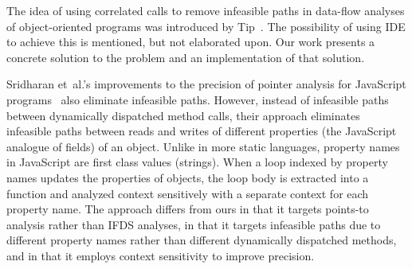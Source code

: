 
The idea of using correlated calls to remove infeasible paths in data-flow analyses of object-oriented programs was introduced by Tip~\cite{DBLP:journals/scp/Tip15}. The possibility of using IDE to achieve this is mentioned, but not elaborated upon. Our work presents a concrete solution to the problem and an implementation of that solution.

Sridharan et~al.'s improvements to the precision of pointer analysis
for JavaScript programs~\cite{DBLP:conf/ecoop/SridharanDCST12} also
eliminate infeasible paths. However, instead of infeasible paths
between dynamically dispatched method calls, their approach eliminates
infeasible paths between reads and writes of different properties
(the JavaScript analogue of fields) of an object. Unlike in more static languages,
property names in JavaScript are first class values (strings). When a loop indexed by
property names updates the properties of objects, the loop body is extracted into a function
and analyzed context sensitively with a separate context for each property name.
The approach differs from ours in that it targets points-to analysis rather
than IFDS analyses, in that it targets infeasible paths due to different
property names rather than different dynamically dispatched methods,
and in that it employs context sensitivity to improve precision.


